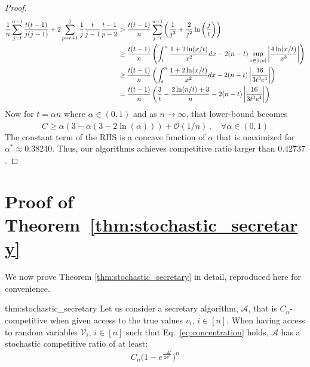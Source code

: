 \begin{proof}
\begin{align}
    \frac{1}{n} \sum_{j = t}^{n-1}\frac{t(t - 1)}{j (j - 1)} + 2 \sum_{p = t + 1}^{j}\frac{1}{j}\frac{t}{j - 1}\frac{t-1}{p-2} 
    & > \frac{t(t-1)}{n}\sum_{j = t}^{n-1}\left(\frac{1}{j^2} + \frac{2}{j^2}\ln\left(\frac{j}{t}\right)\right) \\
    & \geq \frac{t(t-1)}{n}\left(\int_{t}^{n}  \frac{1+2\ln(x/t)}{x^2} dx - 2(n-t) \sup_{x \in [t,n]} \left| 
    \frac{4 \ln(x/t)}{x ^3}\right| \right) \notag \\
    & \geq  \frac{t(t-1)}{n}\left(\int_{t}^{n}  \frac{1+2\ln(x/t)}{x^2} dx - 2(n-t) \left| \frac{16}{3 t^3 e^4} \right| \right) \notag \\
    & = 
    \frac{t(t -1)}{n} \left(\frac{3}{t}-\frac{2\ln(n/t) + 3}{n} - 2(n-t) \left| \frac{16}{3 t^3 e^4} \right|\right) 
\end{align}
Now for $t = \alpha n$ where $\alpha \in (0, 1)$ and as $n \xrightarrow[]{} \infty$, that lower-bound becomes 
\begin{equation}
C \geq \alpha (3 - \alpha(3 - 2\ln (\alpha))) + \mathcal{O}(1/n) \,,\quad \forall \alpha \in (0,1)
\end{equation}
The constant term of the RHS is a concave function of $\alpha$ that is maximized for $\alpha^* \approx 0.38240$. Thus, our algorithms achieves competitive ratio larger than $0.42737$.
\end{proof}


\clearpage



\section{Proof of Theorem~\ref{thm:stochastic_secretary}}
\label{appendix:proof_thm2}
We now prove Theorem \ref{thm:stochastic_secretary} in detail, reproduced here for convenience. 

\begin{reptheorem}{thm:stochastic_secretary}
Let us consider a secretary algorithm, $\mathcal{A}$, that is $C_n$-competitive when given access to the true values $v_i, \,i \in [n]$. When having access to random variables $\mathcal{V}_{i},\, i\in [n]$ such that Eq.~\ref{eq:concentration} holds, $\mathcal{A}$ has a stochastic competitive ratio of at least:  
\begin{equation}
    C_n \big(1 - e^{\frac{-\Delta^2}{2\sigma^2}}\big)^{n}
\end{equation}
\end{reptheorem}

